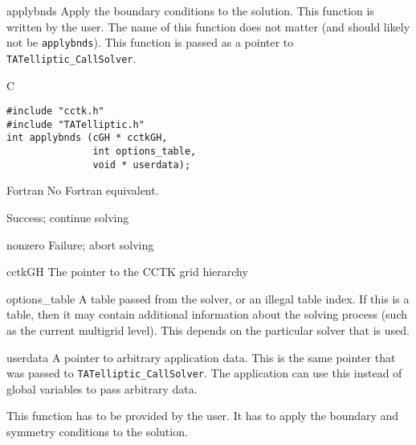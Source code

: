 \begin{FunctionDescription}{applybnds}{}
\label{TATelliptic-applybnds}
Apply the boundary conditions to the solution.  This function is
written by the user.  The name of this function does not matter (and
should likely not be \texttt{applybnds}).  This function is passed as
a pointer to \texttt{TATelliptic\_CallSolver}.

\begin{SynopsisSection}
\begin{Synopsis}{C}
\begin{verbatim}
#include "cctk.h"
#include "TATelliptic.h"
int applybnds (cGH * cctkGH,
               int options_table,
               void * userdata);
\end{verbatim}
\end{Synopsis}
\begin{Synopsis}{Fortran}
No Fortran equivalent.
\end{Synopsis}
\end{SynopsisSection}

\begin{ResultSection}
\begin{Result}{0}
Success; continue solving
\end{Result}
\begin{Result}{nonzero}
Failure; abort solving
\end{Result}
\end{ResultSection}

\begin{ParameterSection}
\begin{Parameter}{cctkGH}
The pointer to the CCTK grid hierarchy
\end{Parameter}
\begin{Parameter}{options\_table}
A table passed from the solver, or an illegal table index.  If this is
a table, then it may contain additional information about the solving
process (such as the current multigrid level).  This depends on the
particular solver that is used.
\end{Parameter}
\begin{Parameter}{userdata}
A pointer to arbitrary application data.  This is the same pointer
that was passed to \texttt{TATelliptic\_CallSolver}.  The application
can use this instead of global variables to pass arbitrary data.
\end{Parameter}
\end{ParameterSection}

\begin{Discussion}
This function has to be provided by the user.  It has to apply the
boundary and symmetry conditions to the solution.


\end{Discussion}
\end{FunctionDescription}
